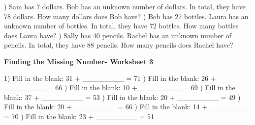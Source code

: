 \documentclass{article}%
\begin{document}
\newline%
) Sam has 7 dollars. Bob has an unknown number of dollars. In total, they have 78 dollars. How many dollars does Bob have?%
\newline%
\newline%
) Bob has 27 bottles. Laura has an unknown number of bottles. In total, they have 72 bottles. How many bottles does Laura have?%
\newline%
\newline%
) Sally has 40 pencils. Rachel has an unknown number of pencils. In total, they have 88 pencils. How many pencils does Rachel have?%
\newline%
\newline%
\newline%
\pagebreak%
\large%
\begin{center}%
\textbf{Finding the Missing Number- Worksheet 3}%
\newline%
\end{center} \normalsize%
1) Fill in the blank: 31 + \_\_\_\_\_\_\_\_ = 71%
\newline%
\newline%
) Fill in the blank: 26 + \_\_\_\_\_\_\_\_ = 66%
\newline%
\newline%
) Fill in the blank: 10 + \_\_\_\_\_\_\_\_ = 69%
\newline%
\newline%
) Fill in the blank: 37 + \_\_\_\_\_\_\_\_ = 53%
\newline%
\newline%
) Fill in the blank: 20 + \_\_\_\_\_\_\_\_ = 49%
\newline%
\newline%
) Fill in the blank: 20 + \_\_\_\_\_\_\_\_ = 66%
\newline%
\newline%
) Fill in the blank: 14 + \_\_\_\_\_\_\_\_ = 70%
\newline%
\newline%
) Fill in the blank: 23 + \_\_\_\_\_\_\_\_ = 51%
\end{document}
